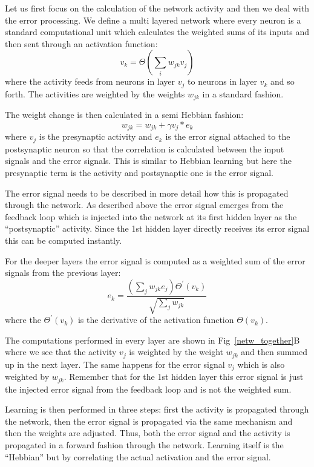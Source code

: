 \documentclass{llncs}
\begin{document}
Let us first focus on the calculation of the network activity and then
we deal with the error processing. We define a multi layered network
where every neuron is a standard computational unit which calculates
the weighted sums of its inputs and then sent through an activation
function:
\begin{equation}
  v_k = \Theta\left( \sum_i w_{jk} v_{j} \right) \label{act_sum}
\end{equation}
where the activity feeds from neurons in layer $v_j$ to neurons in layer $v_k$
and so forth. The activities are weighted by the weights $w_{jk}$
in a standard fashion.

The weight change is then calculated in a semi Hebbian fashion:
\begin{equation}
  w_{jk} = w_{jk} + \gamma v_j * e_k
\end{equation}
where $v_j$ is the presynaptic activity and $e_k$ is the error signal
attached to the postsynaptic neuron so that the correlation is
calculated between the input signals and the error signals. This is similar
to Hebbian learning but here the presynaptic term is the activity
and postsynaptic one is the error signal.

The error signal needs to be described in more detail how this
is propagated through the network. As described above the error
signal emerges from the feedback loop which is injected into the
network at its first hidden layer as the ``postsynaptic'' activity.
Since the 1st hidden layer directly receives its error signal this
can be computed instantly.

For the deeper layers the error signal is computed as a weighted
sum of the error signals from the previous layer:
\begin{equation}
  e_k = \frac{\left( \sum_j w_{jk} e_{j} \right) \Theta^\prime (v_k) }{\sqrt{\sum_j w_{jk}}}
\end{equation}
where the $\Theta^\prime (v_k)$ is the derivative of the activation
function $\Theta(v_k)$.

The computations performed in every layer are shown in
Fig~\ref{netw_together}B where we see that the activity $v_j$ is
weighted by the weight $w_{jk}$ and then summed up in the next
layer. The same happens for the error signal $v_j$ which is also
weighted by $w_{jk}$. Remember that for the 1st hidden layer this
error signal is just the injected error signal from the feedback loop
and is not the weighted sum.

Learning is then performed in three steps: first the activity is propagated through
the network, then the error signal is propagated via the same mechanism and then the
weights are adjusted. Thus, both the error
signal and the activity is propagated in a forward fashion through the network.
Learning itself is the ``Hebbian'' but by correlating the actual activation
and the error signal. 
\end{document}
